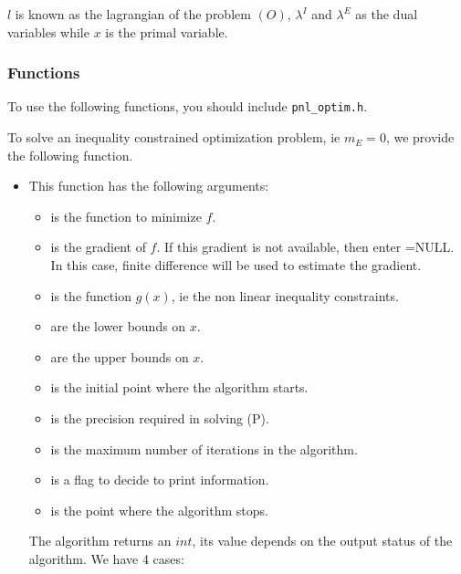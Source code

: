 $l$ is known as the lagrangian of the problem $(O)$, $\lambda^I$ and $\lambda^E$ as the dual variables while $x$ is the primal variable.

\subsubsection{Functions}

To use the following functions, you should include \verb!pnl_optim.h!.

To solve an inequality constrained optimization problem, ie $m_E=0$, we provide the following function.
\begin{itemize}
\item {}
  \sshortdescribe This function has the following arguments:

\begin{itemize}
 \item {} is the function to minimize $f$.
 \item {} is the gradient of $f$. If this gradient is not available, then enter =NULL. In this case, finite difference will be used to estimate the gradient.
 \item {} is the function $g(x)$, ie the non linear inequality constraints.
 \item {} are the lower bounds on $x$.
 \item {} are the upper bounds on $x$.
 \item {} is the initial point where the algorithm starts.
 \item {} is the precision required in solving (P).
 \item {} is the maximum number of iterations in the algorithm.
 \item {} is a flag to decide to print information.
 \item {} is the point where the algorithm stops.
\end{itemize}

The algorithm returns an $int$, its value depends on the output status of the algorithm. We have 4 cases:


\end{itemize}
